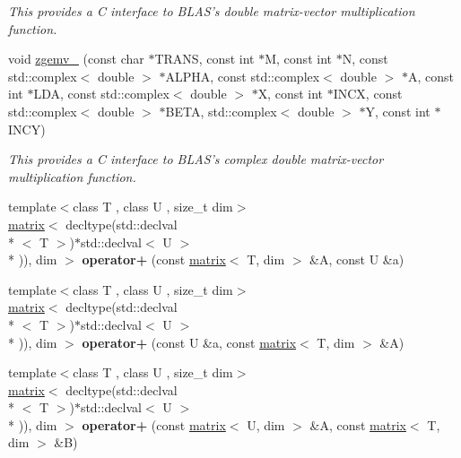 \begin{DoxyCompactItemize}
\begin{DoxyCompactList}\small\item\em This provides a C interface to B\-L\-A\-S's double matrix-\/vector multiplication function. \end{DoxyCompactList}\item 
\hypertarget{namespacekeycpp_aea174778653491b5fd21dd2960c0f7cb}{void \hyperlink{namespacekeycpp_aea174778653491b5fd21dd2960c0f7cb}{zgemv\-\_\-} (const char $\ast$T\-R\-A\-N\-S, const int $\ast$M, const int $\ast$N, const std\-::complex$<$ double $>$ $\ast$A\-L\-P\-H\-A, const std\-::complex$<$ double $>$ $\ast$A, const int $\ast$L\-D\-A, const std\-::complex$<$ double $>$ $\ast$X, const int $\ast$I\-N\-C\-X, const std\-::complex$<$ double $>$ $\ast$B\-E\-T\-A, std\-::complex$<$ double $>$ $\ast$Y, const int $\ast$I\-N\-C\-Y)}\label{namespacekeycpp_aea174778653491b5fd21dd2960c0f7cb}

\begin{DoxyCompactList}\small\item\em This provides a C interface to B\-L\-A\-S's complex double matrix-\/vector multiplication function. \end{DoxyCompactList}\item 
\hypertarget{namespacekeycpp_adb8866924fddc4057262b0ab42615437}{{\footnotesize template$<$class T , class U , size\-\_\-t dim$>$ }\\\hyperlink{classkeycpp_1_1matrix}{matrix}$<$ decltype(std\-::declval\\*
$<$ T $>$)$\ast$std\-::declval$<$ U $>$\\*
)), dim $>$ {\bfseries operator+} (const \hyperlink{classkeycpp_1_1matrix}{matrix}$<$ T, dim $>$ \&A, const U \&a)}\label{namespacekeycpp_adb8866924fddc4057262b0ab42615437}

\item 
\hypertarget{namespacekeycpp_a8ef9376f867b7683d5bf79a13f052f75}{{\footnotesize template$<$class T , class U , size\-\_\-t dim$>$ }\\\hyperlink{classkeycpp_1_1matrix}{matrix}$<$ decltype(std\-::declval\\*
$<$ T $>$)$\ast$std\-::declval$<$ U $>$\\*
)), dim $>$ {\bfseries operator+} (const U \&a, const \hyperlink{classkeycpp_1_1matrix}{matrix}$<$ T, dim $>$ \&A)}\label{namespacekeycpp_a8ef9376f867b7683d5bf79a13f052f75}

\item 
\hypertarget{namespacekeycpp_a1de1c62b34a2e4e23329683b4cb338f9}{{\footnotesize template$<$class T , class U , size\-\_\-t dim$>$ }\\\hyperlink{classkeycpp_1_1matrix}{matrix}$<$ decltype(std\-::declval\\*
$<$ T $>$)$\ast$std\-::declval$<$ U $>$\\*
)), dim $>$ {\bfseries operator+} (const \hyperlink{classkeycpp_1_1matrix}{matrix}$<$ U, dim $>$ \&A, const \hyperlink{classkeycpp_1_1matrix}{matrix}$<$ T, dim $>$ \&B)}\label{namespacekeycpp_a1de1c62b34a2e4e23329683b4cb338f9}


\end{DoxyCompactItemize}
